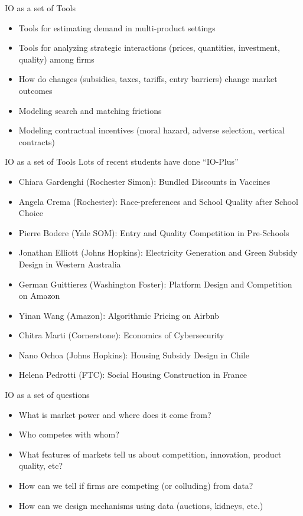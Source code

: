 \documentclass[aspectratio=169,11pt]{beamer}
\begin{document}
\begin{frame}{IO as a set of Tools}
\begin{itemize}
    \item Tools for estimating demand in multi-product settings
    \item Tools for analyzing strategic interactions (prices, quantities, investment, quality) among firms
    \item How do changes (subsidies, taxes, tariffs, entry barriers) change market outcomes
    \item Modeling search and matching frictions
    \item Modeling contractual incentives (moral hazard, adverse selection, vertical contracts)
\end{itemize}
\end{frame}



\begin{frame}{IO as a set of Tools}
Lots of recent students have done ``IO-Plus''
\begin{itemize}
    \item Chiara Gardenghi (Rochester Simon): Bundled Discounts in Vaccines
    \item Angela Crema (Rochester): Race-preferences and School Quality after School Choice
    \item Pierre Bodere (Yale SOM): Entry and Quality Competition in Pre-Schools
    \item Jonathan Elliott (Johns Hopkins): Electricity Generation and Green Subsidy Design in Western Australia
    \item German Guittierez (Washington Foster): Platform Design and Competition on Amazon
    \item Yinan Wang (Amazon): Algorithmic Pricing on Airbnb
    \item Chitra Marti (Cornerstone): Economics of Cybersecurity
    \item Nano Ochoa (Johns Hopkins): Housing Subsidy Design in Chile
    \item Helena Pedrotti (FTC): Social Housing Construction in France
\end{itemize}
\end{frame}



\begin{frame}{IO as a set of questions}
\begin{itemize}
    \item What is market power and where does it come from?
    \item Who competes with whom?
    \item What features of markets tell us about competition, innovation, product quality, etc?
    \item How can we tell if firms are competing (or colluding) from data?
    \item How can we design mechanisms using data (auctions, kidneys, etc.)
\end{itemize}
\end{frame}
\end{document}
